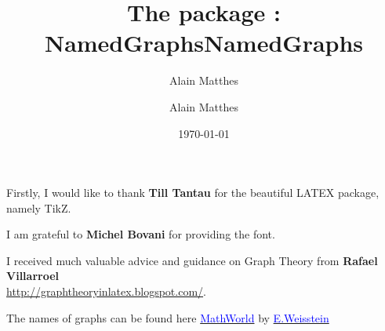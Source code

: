 \documentclass[DIV         = 14,
               fontsize    = 10,
               headinclude = false,
               footinclude = false,
               index       = totoc,
               twoside,
               headings    = small]{tkz-doc}
\title{The package : NamedGraphs}
\author{Alain Matthes}
\gdef\tkznameofpack{NamedGraphs}
\gdef\tkzauthorofpack{Alain Matthes}
\begin{document}
\parindent=0pt
\author{\tkzauthorofpack}  
\title{\tkznameofpack}
\date{\today}
\clearpage
\thispagestyle{empty}
\maketitle

\clearpage


\nameoffile{\tkznameofpack} 


\presentation

\vspace{1cm}

\tkzHand Firstly, I would like to thank \textbf{Till Tantau} for the  beautiful LATEX package, namely TikZ.

\tkzHand I am grateful to  \textbf{Michel Bovani} for providing the  font.

\tkzHand I received much valuable advice and guidance on Graph Theory from \textbf{Rafael Villarroel}\\ \url{http://graphtheoryinlatex.blogspot.com/}.

\tkzHand The names of  graphs can be found here  \href{http://mathworld.wolfram.com/topics/SimpleGraphs.html}%
           {\textcolor{blue}{MathWorld}} by \href{http://en.wikipedia.org/wiki/Eric_W._Weisstein}%
           {\textcolor{blue}{E.Weisstein}}


\clearpage
\tableofcontents
 
\clearpage\newpage 
   
\setlength{\parskip}{1ex plus 0.5ex minus 0.2ex}
  






























\clearpage\newpage
\printindex
\end{document}
